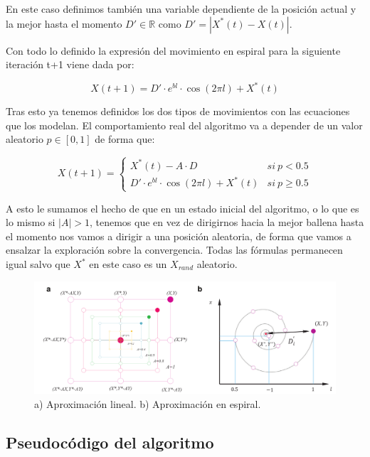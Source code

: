 \documentclass[12pt,a4paper]{article}
\begin{document}
		En este caso definimos también una variable dependiente de la posición actual y la mejor hasta el momento $D'\in \mathbb{R}$ como $D' = |X^*(t)-X(t)|$.
		
		Con todo lo definido la expresión del movimiento en espiral para la siguiente iteración t+1 viene dada por:
		
		$$X(t+1) = D'\cdot e^{bl}\cdot \cos(2\pi l) + X^*(t)$$
		
		Tras esto ya tenemos definidos los dos tipos de movimientos con las ecuaciones que los modelan. El comportamiento real del algoritmo va a depender de un valor aleatorio $p\in [0,1]$ de forma que:
		
		$$X(t+1) = 
		\begin{cases}
			X^*(t)-A\cdot D & si \ p<0.5\\
			D'\cdot e^{bl}\cdot \cos(2\pi l)+X^*(t) & si \ p\geq0.5
		\end{cases}$$
		
		A esto le sumamos el hecho de que en un estado inicial del algoritmo, o lo que es lo mismo si $|A|>1$, tenemos que en vez de dirigirnos hacia la mejor ballena hasta el momento nos vamos a dirigir a una posición aleatoria, de forma que vamos a ensalzar la exploración sobre la convergencia. Todas las fórmulas permanecen igual salvo que $X^*$ en este caso es un $X_{rand}$ aleatorio.
		
		\begin{figure}[!h]
			\includegraphics[scale=0.35]{./Imagenes/lineal_espiral.png}
			\caption{a) Aproximación lineal. b) Aproximación en espiral.}
		\end{figure}
		
	\subsection{Pseudocódigo del algoritmo}
	
\end{document}
